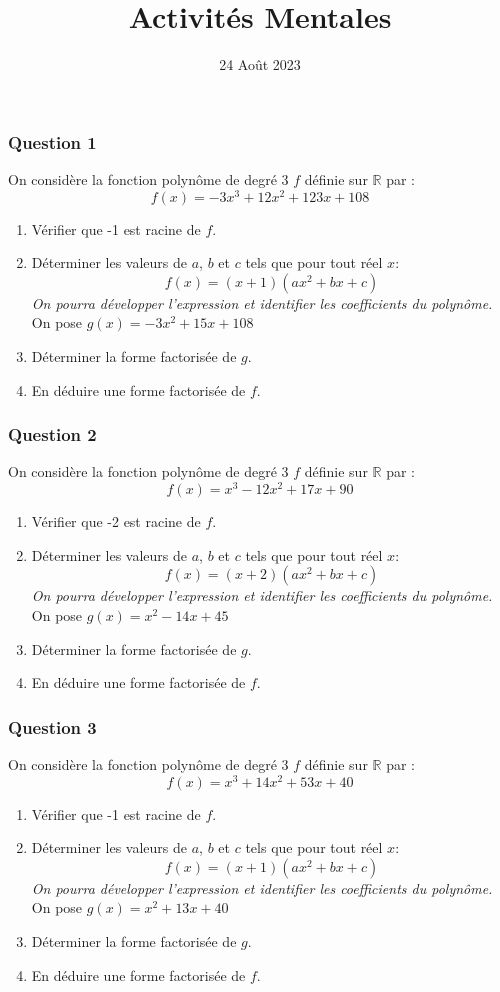 \documentclass[15pt, mathserif]{beamer}
\title{Activités Mentales}
\date{24 Août 2023}
\newcommand{\R}{\mathbb{R}}			%
\begin{document}
\begin{frame}
    \titlepage
\end{frame}

\begin{frame} 
	\frametitle{Question 1}
On considère la fonction polynôme de degré 3 $f$ définie sur $\R$ par : $$f(x)=-3x^3+12x^2+123x+108$$
 
 \begin{enumerate} 
 	 \item Vérifier que -1 est racine de $f$. 
 	 \item Déterminer les valeurs de $a$, $b$ et $c$ tels que pour tout réel $x$: $$f(x)=(x+1)(ax^2+bx+c)$$ 
 	 \textit{On pourra développer l'expression et identifier les coefficients du polynôme.} 
 \medskip 
 	 On pose $g(x)=-3x^2+15x+108$
 	 \item Déterminer la forme factorisée de $g$. 
 	 \item En déduire une forme factorisée de $f$.
 
 \end{enumerate} 
 \end{frame}


\begin{frame} 
	\frametitle{Question 2}
On considère la fonction polynôme de degré 3 $f$ définie sur $\R$ par : $$f(x)=x^3-12x^2+17x+90$$
 
 \begin{enumerate} 
 	 \item Vérifier que -2 est racine de $f$. 
 	 \item Déterminer les valeurs de $a$, $b$ et $c$ tels que pour tout réel $x$: $$f(x)=(x+2)(ax^2+bx+c)$$ 
 	 \textit{On pourra développer l'expression et identifier les coefficients du polynôme.} 
 \medskip 
 	 On pose $g(x)=x^2-14x+45$
 	 \item Déterminer la forme factorisée de $g$. 
 	 \item En déduire une forme factorisée de $f$.
 
 \end{enumerate} 
 \end{frame}


\begin{frame} 
	\frametitle{Question 3}
On considère la fonction polynôme de degré 3 $f$ définie sur $\R$ par : $$f(x)=x^3+14x^2+53x+40$$
 
 \begin{enumerate} 
 	 \item Vérifier que -1 est racine de $f$. 
 	 \item Déterminer les valeurs de $a$, $b$ et $c$ tels que pour tout réel $x$: $$f(x)=(x+1)(ax^2+bx+c)$$ 
 	 \textit{On pourra développer l'expression et identifier les coefficients du polynôme.} 
 \medskip 
 	 On pose $g(x)=x^2+13x+40$
 	 \item Déterminer la forme factorisée de $g$. 
 	 \item En déduire une forme factorisée de $f$.
 
 \end{enumerate} 
 \end{frame}
\end{document}
